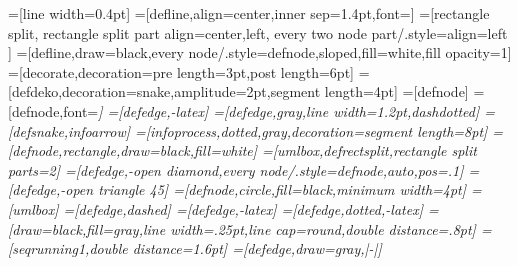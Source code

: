 \usepackage{tikz}
\usetikzlibrary{arrows}
\usetikzlibrary{calc}
\usetikzlibrary{shapes.multipart}
\usetikzlibrary{decorations.pathmorphing}
=[line width=0.4pt]
=[defline,align=center,inner sep=1.4pt,font=\tiny]
=[rectangle split,
rectangle split part align={center,left}, %
every two node part/.style={align=left} %
]
=[defline,draw=black,every node/.style={defnode,sloped,fill=white,fill opacity=1}]
=[decorate,decoration={pre length=3pt,post length=6pt}]
=[defdeko,decoration={snake,amplitude=2pt,segment length=4pt}]
=[defnode]
=[defnode,font=\em\tiny\color{gray}]
=[defedge,-latex]
=[defedge,gray,line width=1.2pt,dashdotted]
=[defsnake,infoarrow]
=[infoprocess,dotted,gray,decoration={segment length=8pt}]
=[defnode,rectangle,draw=black,fill=white]
=[umlbox,defrectsplit,rectangle split parts=2]
=[defedge,-open diamond,every node/.style={defnode,auto,pos=.1}]
=[defedge,-open triangle 45]
=[defnode,circle,fill=black,minimum width=4pt]
=[umlbox]
=[defedge,dashed]
=[defedge,-latex]
=[defedge,dotted,-latex]
=[draw=black,fill=gray,line width=.25pt,line cap=round,double distance=.8pt]
=[seqrunning1,double distance=1.6pt]
=[defedge,draw=gray,|-|]

